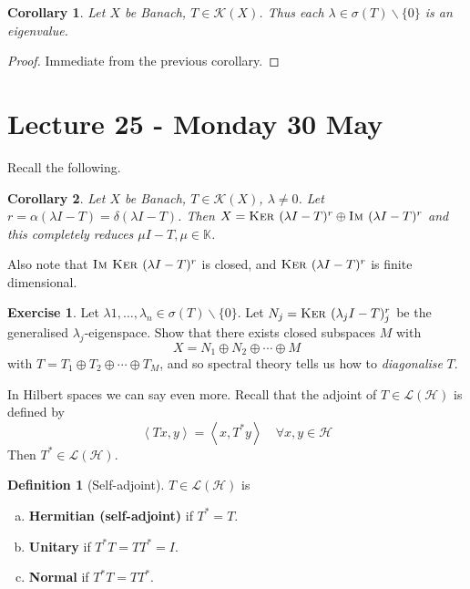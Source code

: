 \documentclass[10pt, oneside, reqno]{amsart}
\theoremstyle{plain}%
\newtheorem*{cor}{Corollary}
\theoremstyle{definition}
\newtheorem{defn}[thm]{Definition}
\newtheorem{exer}[thm]{Exercise}
\theoremstyle{remark}
\newcommand{\K}{\mathbb{K}}
\newcommand{\iprod}[1]{\left\langle #1 \right\rangle}
\newcommand{\im}{\textsc{Im\ }}
\renewcommand{\ker}{\textsc{Ker\ }}
\begin{document}
\begin{cor}
    Let $X$ be Banach, $T \in \mathcal K(X)$.  Thus each $\lambda \in \sigma(T) \backslash \{ 0 \}$ is an eigenvalue.  
\end{cor}
\begin{proof}
    Immediate from the previous corollary.
\end{proof}




\section{Lecture 25 - Monday 30 May} %
\label{sec:lecture_25_monday_30_may}
Recall the following.
\begin{cor}
    Let $X$ be Banach, $T \in \mathcal K(X)$, $\lambda \neq 0$.  Let $r = \alpha(\lambda I - T) = \delta(\lambda I - T)$.  Then $X = \ker(\lambda I - T)^r \oplus \im(\lambda I - T)^r$ and this completely reduces $\mu I - T, \mu \in \K$.
\end{cor}

Also note that $\im \ker(\lambda I - T)^r$ is closed, and $\ker (\lambda I - T)^r$ is finite dimensional.  
\begin{exer}
    Let $\lambda 1, \dots, \lambda_n \in \sigma(T) \backslash \{ 0 \}$.  Let $N_j = \ker(\lambda_j I - T)^r_j$ be the generalised $\lambda_j$-eigenspace.  Show that there exists closed subspaces $M$ with \[
        X = N_1 \oplus N_2 \oplus \cdots \oplus M
    \] with $T = T_1 \oplus T_2 \oplus \cdots \oplus T_M $, and so spectral theory tells us how to \emph{diagonalise} $T$.
\end{exer} 

In Hilbert spaces we can say even more.  Recall that the adjoint of $T \in \mathcal L(\mathcal H)$ is defined by \[
    \iprod{Tx, y} = \iprod{x, T^* y} \quad \forall x, y \in \mathcal H
\]  Then $T^* \in \mathcal L(\mathcal H)$.  
\begin{defn}[Self-adjoint]
$T \in \mathcal L(\mathcal H)$ is \begin{enumerate}[(a)]
    \item \textbf{Hermitian (self-adjoint)} if $T^* = T$.
    \item \textbf{Unitary} if $T^* T = T T^* = I$.  
    \item \textbf{Normal} if $T^* T = T T^*$.  
\end{enumerate}
\end{defn}
\end{document}
